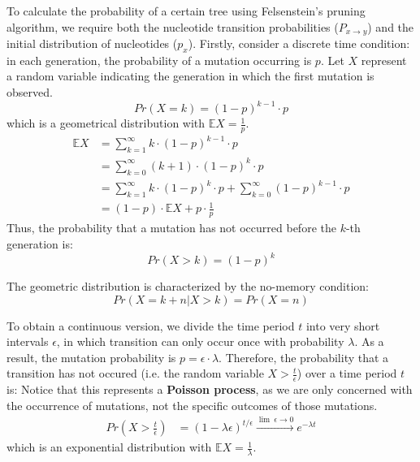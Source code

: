 \documentclass[12pt]{book}
\begin{document}
        To calculate the probability of a certain tree using Felsenstein's pruning algorithm, we require both the nucleotide transition probabilities ($P_{x \rightarrow y}$) and the initial distribution of nucleotides ($p_x$). Firstly, consider a discrete time condition: in each generation, the probability of a mutation occurring is $p$. Let $X$ represent a random variable indicating the generation in which the first mutation is observed.
        \begin{equation*}
            Pr(X = k) = (1-p)^{k-1} \cdot p
        \end{equation*}
        which is a geometrical distribution with $\mathbb{E} X = \frac{1}{p}$.
        {\tiny
        \begin{align*}
            \mathbb{E} X &= \sum_{k=1}^{\infty} k\cdot (1-p)^{k-1} \cdot p\\
            &= \sum_{k=0}^{\infty} (k+1)\cdot (1-p)^k \cdot p\\
            &= \sum_{k=1}^{\infty} k\cdot (1-p)^k \cdot p + \sum_{k=0}^{\infty} (1-p)^{k-1} \cdot p\\
            &= (1-p) \cdot \mathbb{E} X +p \cdot \frac{1}{p}
        \end{align*}}
        Thus, the probability that a mutation has not occurred before the $k$-th generation is:
        \begin{equation*}
            Pr(X > k) = (1-p)^k
        \end{equation*}

        The geometric distribution is characterized by the no-memory condition:
        \begin{equation*}
            Pr(X = k+n | X > k) = Pr(X = n)
        \end{equation*}

        To obtain a continuous version, we divide the time period $t$ into very short intervals $\epsilon$, in which transition can only occur once with probability $\lambda$. As a result, the mutation probability is $p = \epsilon \cdot \lambda$. Therefore, the probability that a transition has not occured (i.e. the random variable $X > \frac{t}{\epsilon}$) over a time period $t$ is:
        Notice that this represents a \textbf{Poisson process}, as we are only concerned with the occurrence of mutations, not the specific outcomes of those mutations.
        \begin{align*}
            Pr(X > \frac{t}{\epsilon})
            &= (1 - \lambda \epsilon) ^{t/\epsilon}
            \stackrel{\lim\ \epsilon \rightarrow 0}{\longrightarrow} e ^{- \lambda t}
        \end{align*}
        which is an exponential distribution with $\mathbb{E} X = \frac{1}{\lambda}$.        
\end{document}
